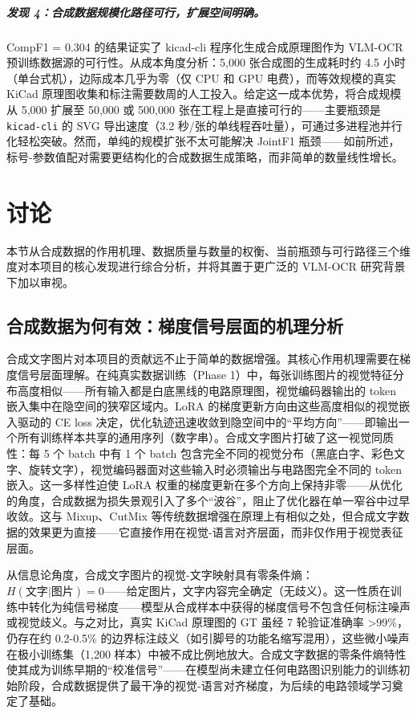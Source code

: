 \subparagraph{发现 4：合成数据规模化路径可行，扩展空间明确。}
CompF1 = 0.304 的结果证实了 kicad-cli 程序化生成合成原理图作为 VLM-OCR 预训练数据源的可行性。从成本角度分析：5,000 张合成图的生成耗时约 4.5 小时（单台式机），边际成本几乎为零（仅 CPU 和 GPU 电费），而等效规模的真实 KiCad 原理图收集和标注需要数周的人工投入。给定这一成本优势，将合成规模从 5,000 扩展至 50,000 或 500,000 张在工程上是直接可行的——主要瓶颈是 \texttt{kicad-cli} 的 SVG 导出速度（3.2 秒/张的单线程吞吐量），可通过多进程池并行化轻松突破。然而，单纯的规模扩张不太可能解决 JointF1 瓶颈——如前所述，标号-参数值配对需要更结构化的合成数据生成策略，而非简单的数量线性增长。

\section{讨论}

本节从合成数据的作用机理、数据质量与数量的权衡、当前瓶颈与可行路径三个维度对本项目的核心发现进行综合分析，并将其置于更广泛的 VLM-OCR 研究背景下加以审视。

\subsection{合成数据为何有效：梯度信号层面的机理分析}

合成文字图片对本项目的贡献远不止于简单的数据增强。其核心作用机理需要在梯度信号层面理解。在纯真实数据训练（Phase 1）中，每张训练图片的视觉特征分布高度相似——所有输入都是白底黑线的电路原理图，视觉编码器输出的 token 嵌入集中在隐空间的狭窄区域内。LoRA 的梯度更新方向由这些高度相似的视觉嵌入驱动的 CE loss 决定，优化轨迹迅速收敛到隐空间中的``平均方向''——即输出一个所有训练样本共享的通用序列（数字串）。合成文字图片打破了这一视觉同质性：每 5 个 batch 中有 1 个 batch 包含完全不同的视觉分布（黑底白字、彩色文字、旋转文字），视觉编码器面对这些输入时必须输出与电路图完全不同的 token 嵌入。这一多样性迫使 LoRA 权重的梯度更新在多个方向上保持非零——从优化的角度，合成数据为损失景观引入了多个``波谷''，阻止了优化器在单一窄谷中过早收敛。这与 Mixup、CutMix 等传统数据增强在原理上有相似之处，但合成文字数据的效果更为直接——它直接作用在视觉-语言对齐层面，而非仅作用于视觉表征层面。

从信息论角度，合成文字图片的视觉-文字映射具有零条件熵：$H(\text{文字}|\text{图片}) = 0$——给定图片，文字内容完全确定（无歧义）。这一性质在训练中转化为纯信号梯度——模型从合成样本中获得的梯度信号不包含任何标注噪声或视觉歧义。与之对比，真实 KiCad 原理图的 GT 虽经 7 轮验证准确率 >99\%，仍存在约 0.2-0.5\% 的边界标注歧义（如引脚号的功能名缩写混用），这些微小噪声在极小训练集（1,200 样本）中被不成比例地放大。合成文字数据的零条件熵特性使其成为训练早期的``校准信号''——在模型尚未建立任何电路图识别能力的训练初始阶段，合成数据提供了最干净的视觉-语言对齐梯度，为后续的电路领域学习奠定了基础。

